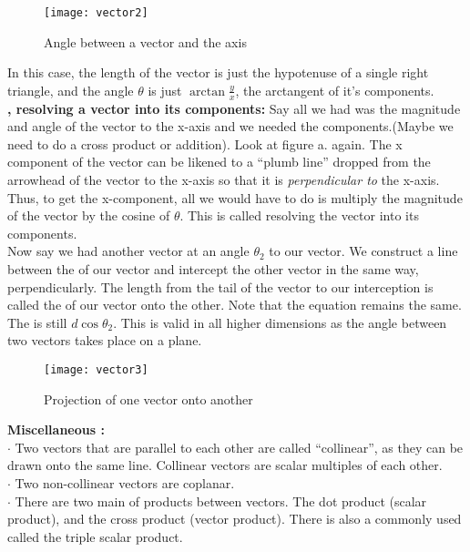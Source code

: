 \documentclass[12pt]{article}
\begin{document}
\begin{figure}[htbp]
\begin{centering}
\texttt{[image: vector2]}
\caption{Angle between a vector and the axis}
\end{centering}
\end{figure}
In this case, the length of the vector is just the hypotenuse of a single right triangle, and the angle $\theta$ is just $\arctan \frac{y}{x}$, the arctangent of it's components.\\
\textbf{, resolving a vector into its components:} Say all we had was the magnitude and angle of the vector to the x-axis and we needed the components.(Maybe we need to do a cross product or addition). Look at figure a. again. The x component of the vector can be likened to a ``plumb line'' dropped from the arrowhead of the vector to the x-axis so that it is \emph{perpendicular to} the x-axis. Thus, to get the x-component, all we would have to do is multiply the magnitude of the vector by the cosine of $\theta$. This is called resolving the vector into its components.\\
Now say we had another vector at an angle $\theta_2$ to our vector. We construct a line between the  of our vector and intercept the other vector in the same way, perpendicularly. The length from the tail of the vector to our interception is called the \emph{} of our vector onto the other. Note that the equation remains the same. The  is still $d\cos\theta_2$. This  is valid in all higher dimensions as the angle between two vectors takes place on a plane.
\begin{figure}[htbp]
\begin{centering}
\texttt{[image: vector3]}
\caption{Projection of one vector onto another}
\end{centering}
\end{figure}
\textbf{Miscellaneous :}\\
$\cdot$ Two vectors that are parallel to each other are called ``collinear'', as they can be drawn onto the same line. Collinear vectors are scalar multiples of each other.\\
$\cdot$ Two non-collinear vectors are coplanar.\\
$\cdot$ There are two main  of products between vectors. The dot product (scalar product), and the cross product (vector product). There is also a commonly used  called the triple scalar product.
\end{document}
